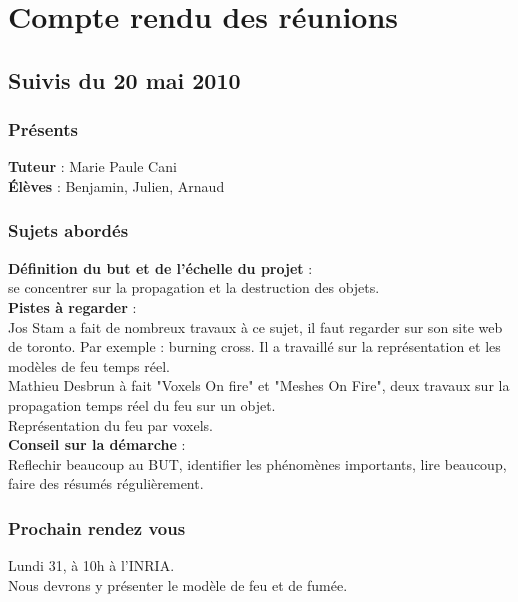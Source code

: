 \documentclass[a4paper,10pt]{article}
\begin{document}
\section{Compte rendu des réunions}

\subsection{Suivis du  20 mai 2010}

\subsubsection{Présents}
\textbf{Tuteur} : Marie Paule Cani \\
\textbf{Élèves} : Benjamin, Julien, Arnaud \\

\subsubsection{Sujets abordés}
\textbf{Définition du but et de l'échelle du projet} :  \\
se concentrer sur la propagation et la destruction des objets.\\

\textbf{Pistes à regarder} : \\
Jos Stam a fait de nombreux travaux à ce sujet, il faut regarder sur son site web de toronto. Par exemple : burning cross. Il a travaillé sur la représentation et  les modèles de feu temps réel.\\
Mathieu Desbrun à fait "Voxels On fire" et "Meshes On Fire", deux travaux sur la propagation temps réel du feu sur un objet.\\
Représentation du feu par voxels.\\

\textbf{Conseil sur la démarche} : \\
Reflechir beaucoup au BUT,
identifier les phénomènes importants,
lire beaucoup,
faire des résumés régulièrement.\\

\subsubsection{Prochain rendez vous}
Lundi 31, à 10h à l'INRIA.\\
Nous devrons y présenter le modèle de feu et de fumée.
\end{document}
